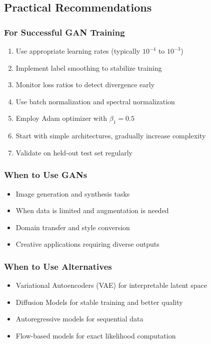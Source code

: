\documentclass[12pt,a4paper]{article}
\begin{document}
\subsection{Practical Recommendations}

\subsubsection{For Successful GAN Training}
\begin{enumerate}
    \item Use appropriate learning rates (typically $10^{-4}$ to $10^{-3}$)
    \item Implement label smoothing to stabilize training
    \item Monitor loss ratios to detect divergence early
    \item Use batch normalization and spectral normalization
    \item Employ Adam optimizer with $\beta_1 = 0.5$
    \item Start with simple architectures, gradually increase complexity
    \item Validate on held-out test set regularly
\end{enumerate}

\subsubsection{When to Use GANs}
\begin{itemize}
    \item Image generation and synthesis tasks
    \item When data is limited and augmentation is needed
    \item Domain transfer and style conversion
    \item Creative applications requiring diverse outputs
\end{itemize}

\subsubsection{When to Use Alternatives}
\begin{itemize}
    \item Variational Autoencoders (VAE) for interpretable latent space
    \item Diffusion Models for stable training and better quality
    \item Autoregressive models for sequential data
    \item Flow-based models for exact likelihood computation
\end{itemize}
\end{document}
